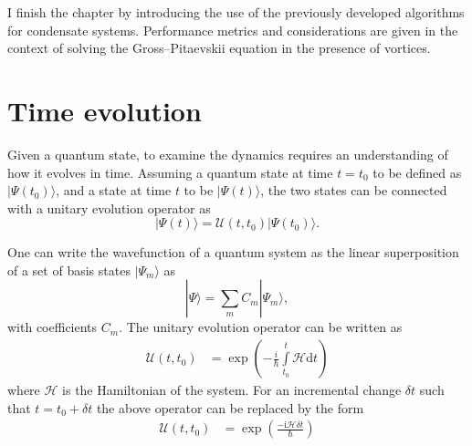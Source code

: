 I finish the chapter by introducing the use of the previously developed algorithms for condensate systems. Performance metrics and considerations are given in the context of solving the Gross--Pitaevskii equation in the presence of vortices.

\section{Time evolution}\label{sec:timeev}
Given a quantum state, to examine the dynamics requires an understanding of how it evolves in time. Assuming a quantum state at time $t=t_0$ to be defined as $|\Psi(t_0) \rangle$, and a state at time $t$ to be $|\Psi(t) \rangle$, the two states can be connected with a unitary evolution operator as
\begin{equation}
    |\Psi(t) \rangle = \mathscr{U}(t,t_0) | \Psi(t_0) \rangle.
\end{equation}

One can write the wavefunction of a quantum system as the linear superposition of a set of basis states $|\Psi_m\rangle$ as
\begin{equation}\label{eqn:psicomplete}
    |\Psi \rangle = \displaystyle\sum\limits_{m} C_m |\Psi_m \rangle,
\end{equation}
with coefficients $C_m$. The unitary evolution operator can be written as
\begin{align}
   \mathscr{U}(t,t_0) &= \exp\left(-\frac{i}{\hbar}\displaystyle\int\limits_{t_0}^{t}\mathcal{H}\text{d}t\right)
\end{align}
where $\mathcal{H}$ is the Hamiltonian of the system. For an incremental change $\delta t$ such that $t = t_0 +\delta t$ the above operator can be replaced by the form
\begin{align}\label{eqn:timev_dt}
   \mathscr{U}(t,t_0) &= \exp\left(\frac{-\text{i}\mathcal{H}\delta t}{\hbar}\right)
\end{align}

